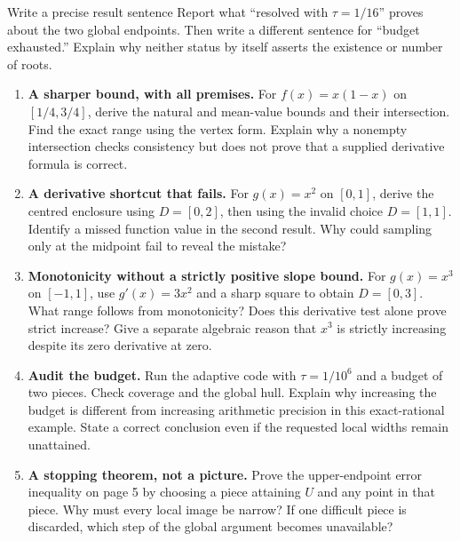 \begin{question}{Write a precise result sentence}
Report what ``resolved with $\tau=1/16$'' proves about the two global endpoints.
Then write a different sentence for ``budget exhausted.'' Explain why neither
status by itself asserts the existence or number of roots.
\end{question}

\newpage
{}
\begin{enumerate}
\item \textbf{A sharper bound, with all premises.} For $f(x)=x(1-x)$ on
$[1/4,3/4]$, derive the natural and mean-value bounds and their intersection.
Find the exact range using the vertex form. Explain why a nonempty
intersection checks consistency but does not prove that a supplied derivative
formula is correct.

\item \textbf{A derivative shortcut that fails.} For $g(x)=x^2$ on $[0,1]$,
derive the centred enclosure using $D=[0,2]$, then using the invalid choice
$D=[1,1]$. Identify a missed function value in the second result. Why could
sampling only at the midpoint fail to reveal the mistake?

\item \textbf{Monotonicity without a strictly positive slope bound.}
For $g(x)=x^3$ on $[-1,1]$, use $g'(x)=3x^2$ and a sharp square to obtain
$D=[0,3]$. What range follows from monotonicity? Does this derivative test
alone prove strict increase? Give a separate algebraic reason that $x^3$ is
strictly increasing despite its zero derivative at zero.

\item \textbf{Audit the budget.} Run the adaptive code with
$\tau=1/10^6$ and a budget of two pieces. Check coverage and the global hull.
Explain why increasing the budget is different from increasing arithmetic
precision in this exact-rational example. State a correct conclusion even
if the requested local widths remain unattained.

\item \textbf{A stopping theorem, not a picture.} Prove the upper-endpoint
error inequality on page 5 by choosing a piece attaining $U$ and any point
in that piece. Why must every local image be narrow? If one difficult piece
is discarded, which step of the global argument becomes unavailable?
\end{enumerate}

